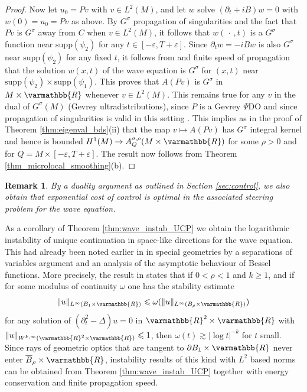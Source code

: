 \documentclass[12pt,twoside]{amsart}
\numberwithin{equation}{section}
\renewcommand{\leq}{\leqslant}
\renewcommand{\geq}{\geqslant}
\renewcommand{\mathbb}{\varmathbb}
\newtheorem{remark}[theorem]{Remark}
\newcommand {\p} {\partial}
\newcommand{\mR}{\mathbb{R}}                    %
\newcommand{\abs}[1]{\lvert #1 \rvert}          %
\newcommand{\norm}[1]{\lVert #1 \rVert}         %
\newcommand{\ol}[1]{\overline{#1}}
\newcommand{\eps}{\varepsilon}
\newcommand{\supp}{\mathrm{supp}}
\begin{document}
\begin{proof}
Now let $u_0 = Pv$ with $v \in L^2(M)$, and let $w$ solve $(\p_t + iB) w = 0$ with $w(0) = u_0 = Pv$ as above. By $G^{\sigma}$ propagation of singularities and the fact that $Pv$ is $G^{\sigma}$ away from $C$ when $v \in L^2(M)$, it follows that $w(\,\cdot\,,t)$ is a $G^{\sigma}$ function near $\supp(\psi_2)$ for any $t \in [-\eps,T+\eps]$. Since $\p_t w = -iBw$ is also $G^{\sigma}$ near $\supp(\psi_2)$ for any fixed $t$, it follows from \cite[end of Lecture IV]{Mizohata} and finite speed of propagation that the solution $w(x,t)$ of the wave equation is $G^{\sigma}$ for $(x,t)$ near $\supp(\psi_2) \times \supp(\psi_1)$. This proves that $A(Pv)$ is $G^{\sigma}$ in $M \times \mR$ whenever $v \in L^2(M)$. This remains true for any $v$ in the dual of $G^{\sigma}(M)$ (Gevrey ultradistributions), since $P$ is a Gevrey $\Psi$DO and since propagation of singularities is valid in this setting \cite{CZ}. This implies as in the proof of Theorem \ref{thm:eigenval_bds}(ii) that the map $v \mapsto A(Pv)$ has $G^{\sigma}$ integral kernel and hence is bounded $H^1(M) \to A^{\sigma,\rho}_Q(M \times \mR)$ for some $\rho > 0$ and for $Q = M \times [-\eps,T+\eps]$. The result now follows from Theorem \ref{thm_microlocal_smoothing}(b).
\end{proof}

\begin{remark}
\label{rmk:dual_control}
By a duality argument as outlined in Section \ref{sec:control}, we also obtain that exponential cost of control is optimal in the associated steering problem for the wave equation.
\end{remark}


As a corollary of Theorem \ref{thm:wave_instab_UCP} we obtain the logarithmic instability of unique continuation in space-like directions for the wave equation. This had already been noted earlier in \cite{John} in special geometries by a separations of variables argument and an analysis of the asymptotic behaviour of Bessel functions. More precisely, the result in \cite{John} states that if $0 < \rho < 1$ and $k \geq 1$, and if for some modulus of continuity $\omega$ one has the stability estimate 
\[
\norm{u}_{L^{\infty}(B_1 \times \mR)} \leq \omega(\norm{u}_{L^{\infty}(B_{\rho} \times \mR)})
\]
for any solution of $(\p_t^2 - \Delta) u = 0$ in $\mR^2 \times \mR$ with $\norm{u}_{W^{k,\infty}(\mR^2 \times \mR)} \leq 1$, then $\omega(t) \gtrsim \abs{\log t}^{-k}$ for $t$ small. Since rays of geometric optics that are tangent to $\p B_1 \times \mR$ never enter $\ol{B}_{\rho} \times \mR$, instability results of this kind with $L^2$ based norms can be obtained from Theorem \ref{thm:wave_instab_UCP} together with energy conservation and finite propagation speed.
\end{document}
